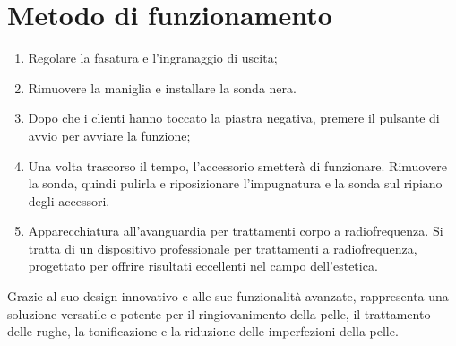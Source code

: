 \documentclass[a4paper]{article}
\begin{document}
\section{Metodo di funzionamento}
\begin{enumerate}
  \item Regolare la fasatura e l'ingranaggio di uscita;
  \item Rimuovere la maniglia e installare la sonda nera.
  \item Dopo che i clienti hanno toccato la piastra negativa, premere il pulsante di avvio per avviare la funzione;
  \item Una volta trascorso il tempo, l'accessorio smetterà di funzionare. Rimuovere la sonda, quindi pulirla e riposizionare l'impugnatura e la sonda sul ripiano degli accessori.
  \item Apparecchiatura all'avanguardia per trattamenti corpo a radiofrequenza. Si tratta di un dispositivo professionale per trattamenti a radiofrequenza, progettato per offrire risultati eccellenti nel campo dell'estetica.
\end{enumerate}

Grazie al suo design innovativo e alle sue funzionalità avanzate, rappresenta una soluzione versatile e potente per il ringiovanimento della pelle, il trattamento delle rughe, la tonificazione e la riduzione delle imperfezioni della pelle.
\end{document}
